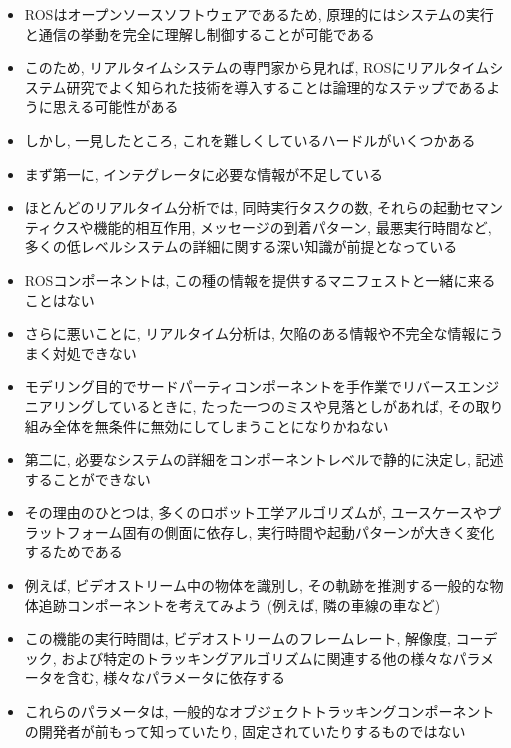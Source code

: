 \begin{frame}{}
    \begin{itemize}
        \item ROSはオープンソースソフトウェアであるため, 原理的にはシステムの実行と通信の挙動を完全に理解し制御することが可能である
        \item このため, リアルタイムシステムの専門家から見れば, ROSにリアルタイムシステム研究でよく知られた技術を導入することは論理的なステップであるように思える可能性がある
        \item しかし, 一見したところ, これを難しくしているハードルがいくつかある
    \end{itemize}
\end{frame}

\begin{frame}{}
    \begin{itemize}
        \item まず第一に, インテグレータに必要な情報が不足している
        \item ほとんどのリアルタイム分析では, 同時実行タスクの数, それらの起動セマンティクスや機能的相互作用, メッセージの到着パターン, 最悪実行時間など, 多くの低レベルシステムの詳細に関する深い知識が前提となっている
        \item ROSコンポーネントは, この種の情報を提供するマニフェストと一緒に来ることはない
        \item さらに悪いことに, リアルタイム分析は, 欠陥のある情報や不完全な情報にうまく対処できない
        \item モデリング目的でサードパーティコンポーネントを手作業でリバースエンジニアリングしているときに, たった一つのミスや見落としがあれば, その取り組み全体を無条件に無効にしてしまうことになりかねない
    \end{itemize}
\end{frame}

\begin{frame}{}
    \begin{itemize}
        \item 第二に, 必要なシステムの詳細をコンポーネントレベルで静的に決定し, 記述することができない
        \item その理由のひとつは, 多くのロボット工学アルゴリズムが, ユースケースやプラットフォーム固有の側面に依存し, 実行時間や起動パターンが大きく変化するためである
        \item 例えば, ビデオストリーム中の物体を識別し, その軌跡を推測する一般的な物体追跡コンポーネントを考えてみよう (例えば, 隣の車線の車など)
        \item この機能の実行時間は, ビデオストリームのフレームレート, 解像度, コーデック, および特定のトラッキングアルゴリズムに関連する他の様々なパラメータを含む, 様々なパラメータに依存する
        \item これらのパラメータは, 一般的なオブジェクトトラッキングコンポーネントの開発者が前もって知っていたり, 固定されていたりするものではない
    \end{itemize}
\end{frame}

